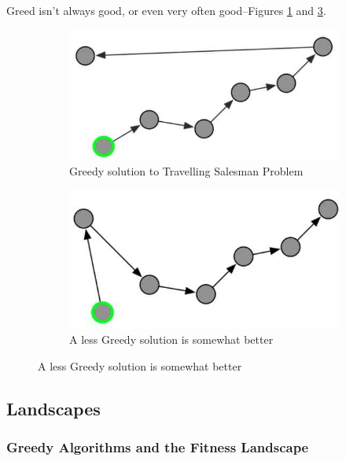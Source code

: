 \documentclass[]{article}
\begin{document}
Greed isn't always good, or even very often good--Figures \ref{fig:greedy:tsp} and \ref{fig:lessgreedy:tsp}.
\begin{figure}[H]
	\caption{Travelling Salesman Problem}
	\begin{subfigure}[t]{0.45\textwidth}
		\caption{Greedy solution to Travelling Salesman Problem}\label{fig:greedy:tsp}
		\includegraphics[width=\textwidth]{tsp1}
	\end{subfigure}
	\;\;\;
	\begin{subfigure}[t]{0.45\textwidth}
		\caption{A less Greedy solution is somewhat better}\label{fig:lessgreedy:tsp}
		\includegraphics[width=\textwidth]{tsp2}
	\end{subfigure}
\end{figure}

\subsection{Landscapes}

\subsubsection{Greedy Algorithms and the Fitness Landscape}
\end{document}
